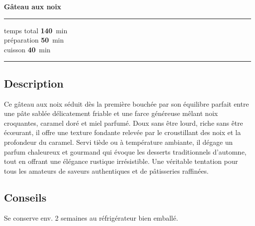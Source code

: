 \documentclass{article}
\begin{document}
\pagestyle{empty}

{\Huge\bfseries Gâteau aux noix}\par
\vspace{2cm}
\noindent
\begin{minipage}[t]{0.3\textwidth}
\vspace{0pt}%
\rule{\linewidth}{1.5pt}
\TopBottomHeat\quad{} temps total \textbf{140}~min \\
\Grill\quad{} préparation \textbf{50}~min \\
\ConvectionOven\quad{} cuisson \textbf{40}~min \\
\rule{\linewidth}{1.5pt}

\subsection*{Description}
Ce gâteau aux noix séduit dès la première bouchée par son équilibre parfait
entre une pâte sablée délicatement friable et une farce généreuse mêlant
noix croquantes, caramel doré et miel parfumé. Doux sans être lourd,
riche sans être écœurant, il offre une texture fondante relevée par
le croustillant des noix et la profondeur du caramel. Servi tiède
ou à température ambiante, il dégage un parfum chaleureux et
gourmand qui évoque les desserts traditionnels d'automne, tout en
offrant une élégance rustique irrésistible. Une véritable tentation
pour tous les amateurs de saveurs authentiques et de pâtisseries raffinées.

\subsection*{Conseils}

Se conserve env. 2 semaines au réfrigérateur bien emballé.

\end{minipage}
\hfill
\end{document}
